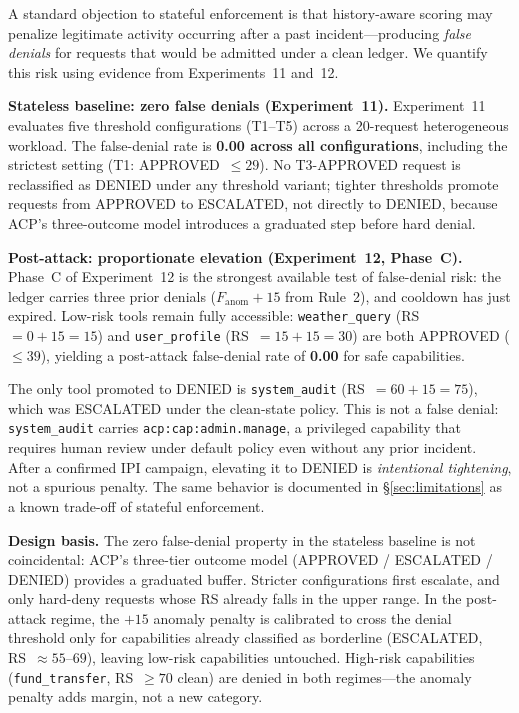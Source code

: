 \documentclass[11pt]{article}
\theoremstyle{definition}
\begin{document}
A standard objection to stateful enforcement is that history-aware scoring
may penalize legitimate activity occurring after a past incident---producing
\emph{false denials} for requests that would be admitted under a clean ledger.
We quantify this risk using evidence from Experiments~11 and~12.

\textbf{Stateless baseline: zero false denials (Experiment~11).}
Experiment~11 evaluates five threshold configurations (T1--T5) across a
20-request heterogeneous workload.
The false-denial rate is \textbf{0.00 across all configurations},
including the strictest setting (T1: APPROVED~$\leq 29$).
No T3-APPROVED request is reclassified as DENIED under any threshold variant;
tighter thresholds promote requests from APPROVED to ESCALATED,
not directly to DENIED, because ACP's three-outcome model introduces a
graduated step before hard denial.

\textbf{Post-attack: proportionate elevation (Experiment~12, Phase~C).}
Phase~C of Experiment~12 is the strongest available test of false-denial
risk: the ledger carries three prior denials ($F_\text{anom} +15$
from Rule~2), and cooldown has just expired.
Low-risk tools remain fully accessible:
\texttt{weather\_query} (RS~$=0+15=15$) and \texttt{user\_profile}
(RS~$=15+15=30$) are both APPROVED ($\leq 39$), yielding a post-attack
false-denial rate of \textbf{0.00} for safe capabilities.

The only tool promoted to DENIED is \texttt{system\_audit} (RS~$=60+15=75$),
which was ESCALATED under the clean-state policy.
This is not a false denial: \texttt{system\_audit} carries
\texttt{acp:cap:admin.manage}, a privileged capability that requires
human review under default policy even without any prior incident.
After a confirmed IPI campaign, elevating it to DENIED is
\emph{intentional tightening}, not a spurious penalty.
The same behavior is documented in \S\ref{sec:limitations} as a
known trade-off of stateful enforcement.

\textbf{Design basis.}
The zero false-denial property in the stateless baseline is not
coincidental: ACP's three-tier outcome model (APPROVED / ESCALATED / DENIED)
provides a graduated buffer.
Stricter configurations first escalate, and only hard-deny requests whose
RS already falls in the upper range.
In the post-attack regime, the $+15$ anomaly penalty is calibrated to
cross the denial threshold only for capabilities already classified as
borderline (ESCALATED, RS~$\approx 55$--$69$), leaving low-risk capabilities
untouched.
High-risk capabilities (\texttt{fund\_transfer}, RS~$\geq 70$ clean) are
denied in both regimes---the anomaly penalty adds margin, not a new category.
\end{document}
